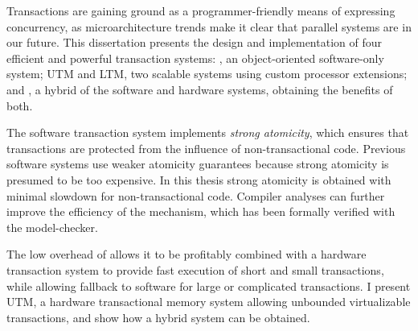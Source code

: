 {\sis

Transactions are gaining ground as a programmer-friendly means of
expressing concurrency, as microarchitecture trends make it
clear that parallel systems are in our future.  This dissertation
presents the design and implementation of four efficient and powerful
transaction systems: \apex, an object-oriented software-only system;
UTM and LTM, two scalable systems using custom processor extensions;
and \hyx, a hybrid of the software and hardware systems,
obtaining the benefits of both.

The software transaction system implements \textit{strong atomicity},
which ensures that transactions are protected from the influence of
non-transactional code.  Previous software systems use weaker
atomicity guarantees because strong atomicity is presumed to be too
expensive.  In this thesis strong atomicity is obtained with
minimal slowdown for non-transactional code.  Compiler analyses can
further improve the efficiency of the mechanism, which has been
formally verified with the \Spin model-checker.

The low overhead of \apex allows it to be profitably
combined with a hardware transaction system to provide fast execution
of short and small transactions, while allowing fallback to software
for large or complicated transactions.  I present UTM, a hardware
transactional memory system allowing unbounded virtualizable
transactions, and show how a hybrid system can be obtained.

}


